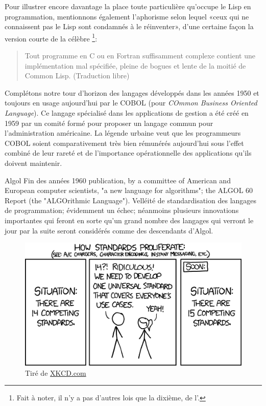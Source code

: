 Pour illustrer encore davantage la place toute particulière qu'occupe
le Lisp en programmation, mentionnons également l'aphorisme selon
lequel «ceux qui ne connaissent pas le Lisp sont condamnés à le
réinventer», d'une certaine façon la version courte de la célèbre
\footnote{%
  Fait à noter, il n'y a pas d'autres lois que la dixième, de
  l'.}: %
\begin{quote}
  Tout programme en C ou en Fortran suffisamment complexe contient
  une implémentation mal spécifiée, pleine de bogues et lente de la
  moitié de Common Lisp. (Traduction libre)
\end{quote}

Complétons notre tour d'horizon des langages développés dans les
années 1950 et toujours en usage aujourd'hui par le COBOL (pour
\emph{COmmon Business Oriented Language}). Ce langage spécialisé dans
les applications de gestion a été créé en 1959 par un comité formé
pour proposer un langage commun pour l'administration américaine. La
légende urbaine veut que les programmeurs COBOL soient comparativement
très bien rémunérés aujourd'hui sous l'effet combiné de leur rareté et
de l'importance opérationnelle des applications qu'ils doivent
maintenir.

Algol Fin des années 1960 publication, by a committee of American and
European computer scientists, "a new language for algorithms"; the
ALGOL 60 Report (the "ALGOrithmic Language"). Velléité de
standardisation des langages de programmation; évidemment un échec;
néanmoins plusieurs innovations importantes qui feront en sorte qu'un
grand nombre des langages qui verront le jour par la suite seront
considérés comme des descendants d'Algol.

\begin{figure}[t]
  \centering
  \begin{minipage}{0.9\linewidth}
    \includegraphics{standards} \\
    \footnotesize\sffamily%
    Tiré de \href{http://xkcd.com/927/}{XKCD.com}
  \end{minipage}
\end{figure}

